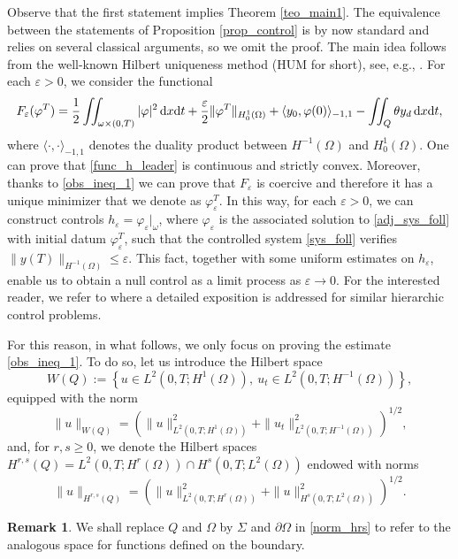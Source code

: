 \documentclass{aims}
\theoremstyle{definition}
\newtheorem{remark}{Remark}
\def\dx{\,\textnormal{d}x}
\def\dt{\textnormal{d}t}
\begin{document}
Observe that the first statement implies Theorem \ref{teo_main1}. The equivalence between the statements of Proposition \ref{prop_control} is by now standard and relies on several classical arguments, so we omit the proof. The main idea follows from the well-known Hilbert uniqueness method (HUM for short), see, e.g., \cite{glo_lions_he,boyer_HUM}. For each $\varepsilon>0$, we consider the functional
%
\begin{equation}\label{func_h_leader}
F_\varepsilon(\varphi^T)=\frac{1}{2}\iint_{\omega\times(0,T)}|\varphi|^2\dx\dt+\frac{\varepsilon}{2}\|\varphi^T\|_{H_0^1(\Omega)}+\langle y_0,\varphi(0)\rangle_{-1,1}-\iint_{Q}\theta y_d\dx\dt,
\end{equation}
%
where $\langle\cdot,\cdot\rangle_{-1,1}$ denotes the duality product between $H^{-1}(\Omega)$ and $H_0^1(\Omega)$. One can prove that \eqref{func_h_leader} is continuous and strictly convex. Moreover, thanks to \eqref{obs_ineq_1} we can prove that $F_\varepsilon$ is coercive and therefore it has a unique minimizer that we denote as $\varphi_\varepsilon^T$. In this way, for each $\varepsilon>0$, we can construct controls $h_\varepsilon=\varphi_\varepsilon|_{\omega}$, where $\varphi_\varepsilon$ is the associated solution to \eqref{adj_sys_foll} with initial datum $\varphi_\varepsilon^T$, such that the controlled system \eqref{sys_foll} verifies $\|y(T)\|_{H^{-1}(\Omega)}\leq \varepsilon$. This fact, together with some uniform estimates on $h_\varepsilon$, enable us to obtain a null control as a limit process as $\varepsilon\to 0$. For the interested reader, we refer to \cite{araruna,vhs_deT_rob} where a detailed exposition is addressed for similar hierarchic control problems. 

For this reason, in what follows, we only focus on proving the estimate \eqref{obs_ineq_1}. To do so, let us introduce the Hilbert space
%
\begin{equation*}
W(Q):=\left\{u\in L^2(0,T;H^1(\Omega)), \ u_t\in L^2(0,T;H^{-1}(\Omega)) \right\},
\end{equation*}
%
equipped with the norm
%
\begin{equation*}
\|u\|_{W(Q)}=\left(\|u\|_{L^2(0,T;H^1(\Omega))}^2+\|u_t\|^2_{L^2(0,T;H^{-1}(\Omega))}\right)^{1/2},
\end{equation*}
%
and, for $r,s\geq 0$, we denote the Hilbert spaces $H^{r,s}(Q)=L^2(0,T;H^r(\Omega))\cap H^s(0,T;L^2(\Omega))$ endowed with  norms
%
\begin{equation}\label{norm_hrs}
\|u\|_{H^{r,s}(Q)}=\left(\|u\|^2_{L^2(0,T;H^r(\Omega))}+\|u\|_{H^s(0,T;L^2(\Omega))}^2\right)^{1/2}.
\end{equation}
%
\begin{remark}
We shall replace $Q$ and $\Omega$ by $\Sigma$ and $\partial\Omega$ in \eqref{norm_hrs} to refer to the analogous space for functions defined on the boundary.  
\end{remark}
\end{document}
